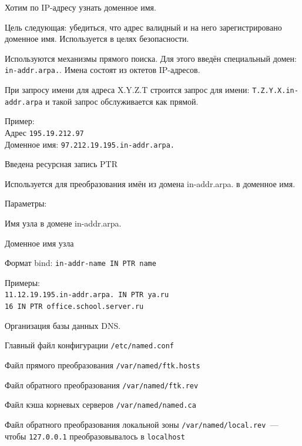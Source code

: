 Хотим по IP-адресу узнать доменное имя. 

Цель следующая: убедиться, что адрес валидный и на него зарегистрировано доменное имя. Используется в целях безопасности.

Используются механизмы прямого поиска. Для этого введён специальный домен: {\tt in-addr.arpa.}. Имена состоят из октетов IP-адресов.

При запросу имени для адреса X.Y.Z.T строится запрос для
имени: {\tt T.Z.Y.X.in-addr.arpa} и такой запрос обслуживается как прямой.

Пример:\\
Адрес {\tt 195.19.212.97}\\
Доменное имя: {\tt 97.212.19.195.in-addr.arpa.}

Введена ресурсная запись PTR

Используется для преобразования имён из домена in-addr.arpa. в доменное имя.

Параметры:
\begin{MyItemize}
    \item Имя узла в домене in-addr.arpa.
    \item Доменное имя узла
\end{MyItemize}

Формат bind: {\tt in-addr-name IN PTR name}

Примеры:\\
{\tt 11.12.19.195.in-addr.arpa. IN PTR ya.ru}\\
{\tt 16 IN PTR office.school.server.ru}


Организация базы данных DNS.
\begin{MyItemize}
    \item Главный файл конфигурации {\tt /etc/named.conf}
    \item Файл прямого преобразования {\tt /var/named/ftk.hosts}
    \item Файл обратного преобразования {\tt /var/named/ftk.rev}
    \item Файл кэша корневых серверов {\tt /var/named/named.ca}
    \item Файл обратного преобразования локальной зоны {\tt /var/named/local.rev}~--- чтобы {\tt 127.0.0.1} преобразовывалось в {\tt localhost}
\end{MyItemize}



